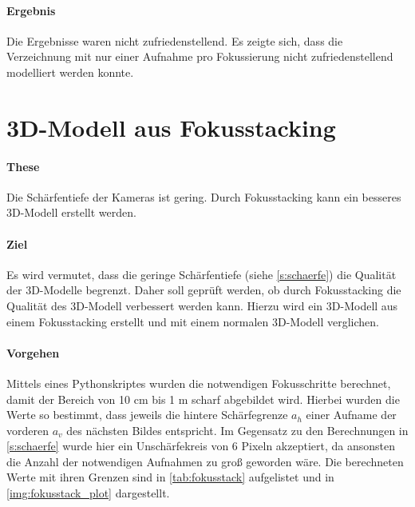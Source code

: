 \documentclass[./00PhotoBox.tex]{subfiles}
\begin{document}
\paragraph{Ergebnis}
Die Ergebnisse waren nicht zufriedenstellend. Es zeigte sich, dass die Verzeichnung mit nur einer Aufnahme pro Fokussierung nicht zufriedenstellend modelliert werden konnte.


\section{3D-Modell aus Fokusstacking}
\label{sec:fokusstacking}


\paragraph{These}
Die Schärfentiefe der Kameras ist gering. Durch Fokusstacking kann ein besseres 3D-Modell erstellt werden.

\paragraph{Ziel}
Es wird vermutet, dass die geringe Schärfentiefe (siehe \autoref{s:schaerfe}) die Qualität der 3D-Modelle begrenzt. Daher soll geprüft werden, ob durch Fokusstacking die Qualität des 3D-Modell verbessert werden kann. Hierzu wird ein 3D-Modell aus einem Fokusstacking erstellt und mit einem normalen 3D-Modell verglichen.

\paragraph{Vorgehen}

Mittels eines Pythonskriptes wurden die notwendigen Fokusschritte berechnet, damit der Bereich von 10 cm bis 1 m scharf abgebildet wird. Hierbei wurden die Werte so bestimmt, dass jeweils die hintere Schärfegrenze $a_h$ einer Aufname der vorderen $a_v$ des nächsten Bildes entspricht. Im Gegensatz zu den Berechnungen in \autoref{s:schaerfe} wurde hier ein Unschärfekreis von 6 Pixeln akzeptiert, da ansonsten die Anzahl der notwendigen Aufnahmen zu groß geworden wäre. Die berechneten Werte mit ihren Grenzen sind in \autoref{tab:fokusstack} aufgelistet und in \autoref{img:fokusstack_plot} dargestellt.
\end{document}
